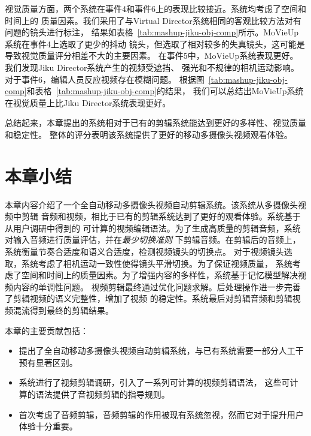 \documentclass[doctor]{ustcthesis}
\begin{document}
视觉质量方面，两个系统在事件4和事件6上的表现比较接近。系统均考虑了空间和时间上的
质量因素。我们采用了与Virtual Director系统相同的客观比较方法对有问题的镜头进行标注，
结果如表格~\ref{tab:mashup-jiku-obj-comp}所示。MoVieUp系统在事件4上选取了更少的抖动
镜头，但选取了相对较多的失真镜头，这可能是导致视觉质量评分相差不大的主要因素。
在事件5中，MoVieUp系统表现更好。我们发现Jiku Director系统产生的视频受遮挡、
强光和不规律的相机运动影响。对于事件6，编辑人员反应视频存在模糊问题。
根据图~\ref{tab:mashup-jiku-obj-comp}和表格~\ref{tab:mashup-jiku-obj-comp}的结果，
我们可以总结出MoVieUp系统在视觉质量上比Jiku Director系统表现更好。


总结起来，本章提出的系统相对于已有的剪辑系统能达到更好的多样性、视觉质量和稳定性。
整体的评分表明该系统提供了更好的移动多摄像头视频观看体验。

\section{本章小结}
本章内容介绍了一个全自动移动多摄像头视频自动剪辑系统。该系统从多摄像头视频中剪辑
音频和视频，相比于已有的剪辑系统达到了更好的观看体验。系统基于从用户调研中得到的
可计算的视频编辑语法。为了生成高质量的剪辑音频，系统对输入音频进行质量评估，并在\emph{最少切换准则}
下剪辑音频。在剪辑后的音频上，系统衡量节奏合适度和语义合适度，检测视频镜头的切换点。
对于视频镜头选取，系统考虑了相机运动一致性使得镜头平滑切换。为了保证视频质量，
系统考虑了空间和时间上的质量因素。为了增强内容的多样性，系统基于记忆模型解决视频内容的单调性问题。
视频剪辑最终通过优化问题求解。后处理操作进一步完善了剪辑视频的语义完整性，增加了视频
的稳定性。系统最后对剪辑音频和剪辑视频混流得到最终的剪辑结果。

本章的主要贡献包括：
\vspace{-0.5em}
\begin{itemize}\setlength{\itemsep}{-0.3em}
    \item 提出了全自动移动多摄像头视频自动剪辑系统，与已有系统需要一部分人工干预有显著区别。
    \item 系统进行了视频剪辑调研，引入了一系列可计算的视频剪辑语法，
        这些可计算的语法提供了音视频剪辑的指导规则。
    \item 首次考虑了音频剪辑，音频剪辑的作用被现有系统忽视，然而它对于提升用户体验十分重要。
\end{itemize}
\end{document}

